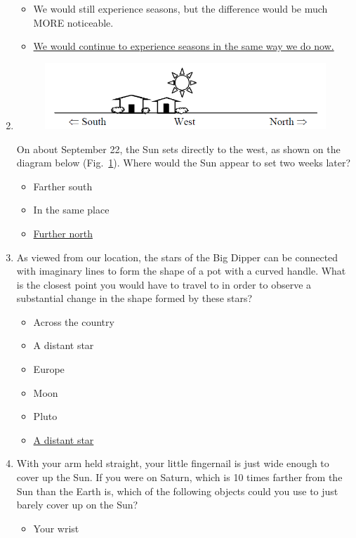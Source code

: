 \documentclass[12pt]{article}
\begin{document}
\begin{enumerate}
\begin{itemize}
    \item We would still experience seasons, but the difference would be much MORE noticeable.
    \item \underline{We would continue to experience seasons in the same way we do now.} 
\end{itemize}
\item
\begin{figure}[htbp]
    \centering
    \includegraphics{asq5.png}
    \caption{}
    \label{fig:asq5}
\end{figure}
On about September 22, the Sun sets directly to the west, as shown on the diagram below (Fig.~\ref{fig:asq5}). Where would the Sun appear to set two weeks later?
\begin{itemize}
    \item Farther south
    \item In the same place
    \item \underline{Further north}
\end{itemize}
\item
As viewed from our location, the stars of the Big Dipper can be connected with imaginary lines to form the shape of a pot with a curved handle. What is the closest point you would have to travel to in order to observe a substantial change in the shape formed by these stars?
\begin{itemize}
    \item Across the country
    \item A distant star
    \item Europe
    \item Moon
    \item Pluto
    \item \underline{A distant star}
\end{itemize}
\item%
With your arm held straight, your little fingernail is just wide enough to cover up the Sun. If you were on Saturn, which is 10 times farther from the Sun than the Earth is, which of the following objects could you use to just barely cover up on the Sun?
\begin{itemize}
    \item Your wrist

\end{itemize}
\end{enumerate}
\end{document}
